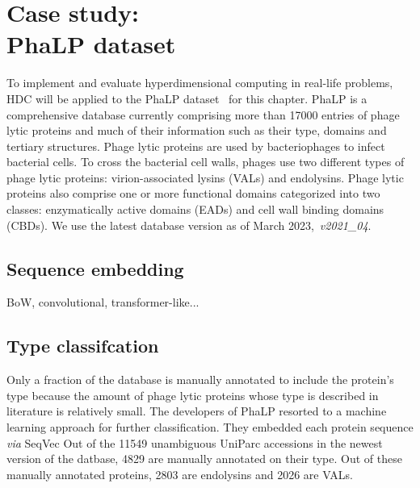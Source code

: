 \chapter[Case study: PhaLP dataset]{Case study: \\PhaLP dataset}
To implement and evaluate hyperdimensional computing in real-life problems, HDC will be applied to the PhaLP dataset~\cite{phalp} for this chapter. PhaLP is a comprehensive database currently comprising more than 17000 entries of phage lytic proteins and much of their information such as their type, domains and tertiary structures. Phage lytic proteins are used by bacteriophages to infect bacterial cells. To cross the bacterial cell walls, phages use two different types of phage lytic proteins: virion-associated lysins (VALs) and endolysins. Phage lytic proteins also comprise one or more functional domains categorized into two classes: enzymatically active domains (EADs) and cell wall binding domains (CBDs). We use the latest database version as of March 2023,~\textit{v2021\_04}.

\section{Sequence embedding}
BoW, convolutional, transformer-like...

\section{Type classifcation}
Only a fraction of the database is manually annotated to include the protein's type because the amount of phage lytic proteins whose type is described in literature is relatively small. The developers of PhaLP resorted to a machine learning approach for further classification. They embedded each protein sequence \textit{via} SeqVec  Out of the 11549 unambiguous UniParc accessions in the newest version of the datbase, 4829 are manually annotated on their type. Out of these manually annotated proteins, 2803 are endolysins and 2026 are VALs. 